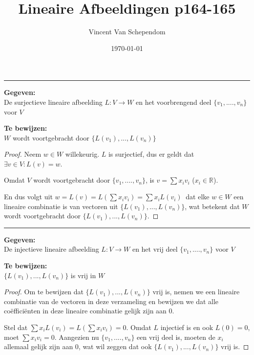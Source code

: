 \documentclass{article}
\title{Lineaire Afbeeldingen p164-165}
\author{Vincent Van Schependom}
\date{\today}
\newcommand{\R}{\mathbb{R}} %
\begin{document}
	\maketitle
	
	\rule{1cm}{0.01mm}
	
	\textbf{Gegeven:}\\
	De surjectieve lineaire afbeelding \(L: V \to W\) en het voorbrengend deel \( \{ v_1,....,v_n \} \) voor \(V\)
	
	\textbf{Te bewijzen:}\\
	 \(W\) wordt voortgebracht door \( \{ L(v_1),...,L(v_n) \} \)
	
	\begin{proof}
		
		Neem \(w \in W\) willekeurig. \(L\) is surjectief, dus er geldt dat \(\exists v \in V: L(v)=w\). 
		
		Omdat \(V\) wordt voortgebracht door \( \{ v_1,....,v_n \} \), is \(v = \sum x_i v_i\) (\(x_i \in \R\)). 
		
		En dus volgt uit \( w = L(v) = L( \sum x_i v_i) =  \sum x_i L(v_i)\ \) dat elke \(w \in W\) een lineaire combinatie is van vectoren uit \( \{ L(v_1),...,L(v_n) \} \), wat betekent dat \(W\) wordt voortgebracht door \( \{ L(v_1),...,L(v_n) \} \).
	\end{proof}
	
	
	
	\rule{1cm}{0.01mm}
	
	\textbf{Gegeven:}\\
	De injectieve lineaire afbeelding \(L: V \to W\) en het vrij deel \( \{ v_1,....,v_n \} \) voor \(V\)
	
	\textbf{Te bewijzen:}\\
	\( \{ L(v_1),...,L(v_n) \} \) is vrij in \(W\)
	
	\begin{proof}
		
		Om te bewijzen dat \( \{ L(v_1),...,L(v_n) \} \) vrij is, nemen we een lineaire combinatie van de vectoren in deze verzameling en bewijzen we dat alle coëfficiënten in deze lineaire combinatie gelijk zijn aan \(0\).
		
		Stel dat \( \sum x_i L(v_i) = L( \sum x_i v_i) = 0 \). Omdat \(L\) injectief is en ook \( L(0) = 0 \), moet \( \sum x_i v_i   = 0\). Aangezien nu \( \{ v_1,....,v_n \} \) een vrij deel is, moeten de \(x_i\) allemaal gelijk zijn aan \(0\), wat wil zeggen dat ook \( \{ L(v_1),...,L(v_n) \} \) vrij is.
		
	\end{proof}
	
\end{document}
